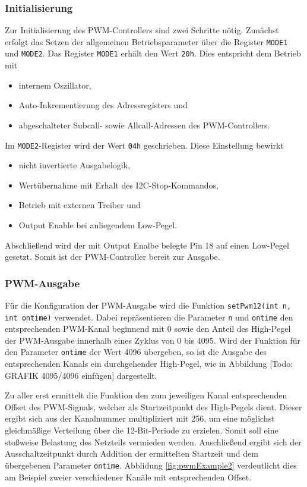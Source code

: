 \documentclass[a4paper,12pt]{scrartcl}
\begin{document}
\subsubsection{Initialisierung}
Zur Initialisierung des PWM-Controllers sind zwei Schritte nötig. Zunächst erfolgt das Setzen der allgemeinen Betriebsparameter über die Register \texttt{MODE1} und \texttt{MODE2}. Das Register \texttt{MODE1} erhält den Wert \texttt{20h}. Dies entspricht dem Betrieb mit 
\begin{itemize}
\item internem Oszillator,
\item Auto-Inkrementierung des Adressregisters und
\item abgeschalteter Subcall- sowie Allcall-Adressen des PWM-Controllers.
\end{itemize}
Im \texttt{MODE2}-Register wird der Wert \texttt{04h} geschrieben. Diese Einstellung bewirkt
\begin{itemize}
\item nicht invertierte Ausgabelogik,
\item Wertübernahme mit Erhalt des I2C-Stop-Kommandos,
\item Betrieb mit externen Treiber und
\item Output Enable bei anliegendem Low-Pegel.
\end{itemize}
Abschließend wird der mit Output Enalbe belegte Pin 18 auf einen Low-Pegel gesetzt. Somit ist der PWM-Controller bereit zur Ausgabe.

\subsubsection{PWM-Ausgabe}
\label{sec:pwmOut}
Für die Konfiguration der PWM-Ausgabe wird die Funktion \texttt{setPwm12(int n, int ontime)} verwendet. Dabei repräsentieren die Parameter \texttt{n} und \texttt{ontime} den entsprechenden PWM-Kanal beginnend mit 0 sowie den Anteil des High-Pegel der PWM-Ausgabe innerhalb eines Zyklus von 0 bis 4095. Wird der Funktion für den Parameter \texttt{ontime} der Wert 4096 übergeben, so ist die Ausgabe des entsprechenden Kanals ein durchgehender High-Pegel, wie in Abbildung [Todo: GRAFIK 4095/4096 einfügen] dargestellt.

Zu aller erst ermittelt die Funktion den zum jeweiligen Kanal entsprechenden Offset des PWM-Signals, welcher als Startzeitpunkt des High-Pegels dient. Dieser ergibt sich aus der Kanalnummer multipliziert mit 256, um eine möglichst gleichmäßige Verteilung über die 12-Bit-Periode zu erzielen. Somit soll eine stoßweise Belastung des Netzteils vermieden werden. Anschließend ergibt sich der Ausschaltzeitpunkt durch Addition der ermittelten Startzeit und dem übergebenen Parameter \texttt{ontime}. Abblidung \ref{fig:pwmExample2} verdeutlicht dies am Beispiel zweier verschiedener Kanäle mit entsprechenden Offset.
\end{document}
